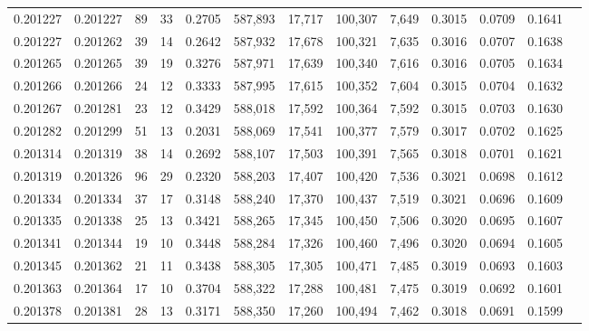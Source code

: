\begin{tabular}{rrrrrrrrrrrrr}
0.201227 & 0.201227 &    89 &  33 &                                     0.2705 & 587,893 &  17,717 & 100,307 &   7,649 & 0.3015 & 0.0709 & 0.1641 \\
0.201227 & 0.201262 &    39 &  14 &                                     0.2642 & 587,932 &  17,678 & 100,321 &   7,635 & 0.3016 & 0.0707 & 0.1638 \\
0.201265 & 0.201265 &    39 &  19 &                                     0.3276 & 587,971 &  17,639 & 100,340 &   7,616 & 0.3016 & 0.0705 & 0.1634 \\
0.201266 & 0.201266 &    24 &  12 &                                     0.3333 & 587,995 &  17,615 & 100,352 &   7,604 & 0.3015 & 0.0704 & 0.1632 \\
0.201267 & 0.201281 &    23 &  12 &                                     0.3429 & 588,018 &  17,592 & 100,364 &   7,592 & 0.3015 & 0.0703 & 0.1630 \\
0.201282 & 0.201299 &    51 &  13 &                                     0.2031 & 588,069 &  17,541 & 100,377 &   7,579 & 0.3017 & 0.0702 & 0.1625 \\
0.201314 & 0.201319 &    38 &  14 &                                     0.2692 & 588,107 &  17,503 & 100,391 &   7,565 & 0.3018 & 0.0701 & 0.1621 \\
0.201319 & 0.201326 &    96 &  29 &                                     0.2320 & 588,203 &  17,407 & 100,420 &   7,536 & 0.3021 & 0.0698 & 0.1612 \\
0.201334 & 0.201334 &    37 &  17 &                                     0.3148 & 588,240 &  17,370 & 100,437 &   7,519 & 0.3021 & 0.0696 & 0.1609 \\
0.201335 & 0.201338 &    25 &  13 &                                     0.3421 & 588,265 &  17,345 & 100,450 &   7,506 & 0.3020 & 0.0695 & 0.1607 \\
0.201341 & 0.201344 &    19 &  10 &                                     0.3448 & 588,284 &  17,326 & 100,460 &   7,496 & 0.3020 & 0.0694 & 0.1605 \\
0.201345 & 0.201362 &    21 &  11 &                                     0.3438 & 588,305 &  17,305 & 100,471 &   7,485 & 0.3019 & 0.0693 & 0.1603 \\
0.201363 & 0.201364 &    17 &  10 &                                     0.3704 & 588,322 &  17,288 & 100,481 &   7,475 & 0.3019 & 0.0692 & 0.1601 \\
0.201378 & 0.201381 &    28 &  13 &                                     0.3171 & 588,350 &  17,260 & 100,494 &   7,462 & 0.3018 & 0.0691 & 0.1599 \\

\end{tabular}
